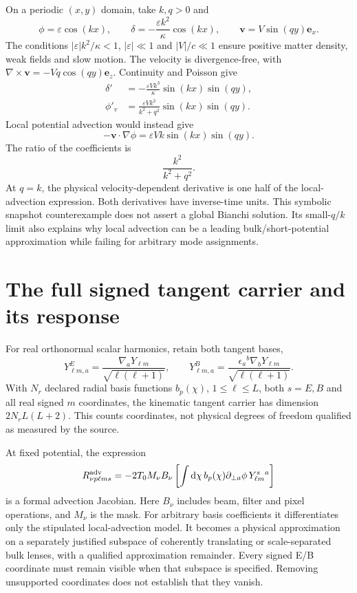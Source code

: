 \documentclass[aps,prd,reprint,onecolumn,notitlepage,nofootinbib]{revtex4-2}
\newcommand{\dd}{\mathrm d}
\newcommand{\vect}[1]{\boldsymbol{#1}}
\begin{document}
On a periodic $(x,y)$ domain, take $k,q>0$ and
\begin{equation}\label{eq:fields}
 \phi=\varepsilon\cos(kx),\qquad
 \delta=-\frac{\varepsilon k^2}{\kappa}\cos(kx),\qquad
 \vect v=V\sin(qy)\vect e_x.
\end{equation}
The conditions $|\varepsilon|k^2/\kappa<1$, $|\varepsilon|\ll1$ and $|V|/c\ll1$ ensure positive matter density, weak fields and slow motion. The velocity is divergence-free, with
$\nabla\times\vect v=-Vq\cos(qy)\vect e_z$.
Continuity and Poisson give
\begin{align}
 \delta'&=-\frac{\varepsilon Vk^3}{\kappa}\sin(kx)\sin(qy),\\
 \phi'_v&=\frac{\varepsilon Vk^3}{k^2+q^2}\sin(kx)\sin(qy).
\end{align}
Local potential advection would instead give
\begin{equation}
 -\vect v\cdot\nabla\phi=\varepsilon Vk\sin(kx)\sin(qy).
\end{equation}
The ratio of the coefficients is
\begin{equation}
 \frac{k^2}{k^2+q^2}.
\end{equation}
At $q=k$, the physical velocity-dependent derivative is one half of the local-advection expression. Both derivatives have inverse-time units. This symbolic snapshot counterexample does not assert a global Bianchi solution. Its small-$q/k$ limit also explains why local advection can be a leading bulk/short-potential approximation while failing for arbitrary mode assignments.

\section{The full signed tangent carrier and its response}

For real orthonormal scalar harmonics, retain both tangent bases,
\begin{equation}
 Y^E_{\ell m,a}=\frac{\nabla_aY_{\ell m}}{\sqrt{\ell(\ell+1)}},
 \qquad
 Y^B_{\ell m,a}=\frac{\epsilon_a{}^b\nabla_bY_{\ell m}}{\sqrt{\ell(\ell+1)}}.
\end{equation}
With $N_r$ declared radial basis functions $b_p(\chi)$, $1\leq\ell\leq L$, both $s=E,B$ and all real signed $m$ coordinates, the kinematic tangent carrier has dimension $2N_rL(L+2)$. This counts coordinates, not physical degrees of freedom qualified as measured by the source.

At fixed potential, the expression
\begin{equation}\label{eq:formal}
 R^{\rm adv}_{\nu p\ell ms}=-2T_0M_\nu B_\nu
 \left[\int\dd\chi\,b_p(\chi)\partial_{\perp a}\phi\,
 Y^s_{\ell m}{}^a\right]
\end{equation}
is a formal advection Jacobian. Here $B_\nu$ includes beam, filter and pixel operations, and $M_\nu$ is the mask. For arbitrary basis coefficients it differentiates only the stipulated local-advection model. It becomes a physical approximation on a separately justified subspace of coherently translating or scale-separated bulk lenses, with a qualified approximation remainder. Every signed E/B coordinate must remain visible when that subspace is specified. Removing unsupported coordinates does not establish that they vanish.
\end{document}
